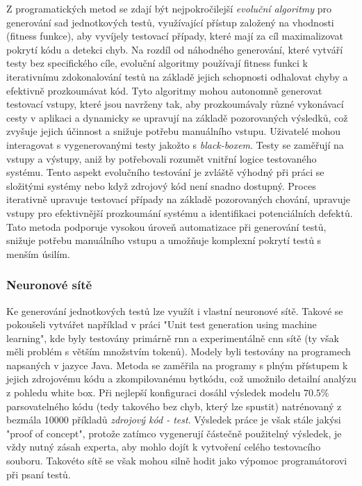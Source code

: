 \documentclass[czech, ma, kiv, he, iso690alph, pdf, viewonly]{fasthesis}
\begin{document}
        Z programatických metod se zdají být nejpokročilejší \emph{evoluční algoritmy} pro generování sad jednotkových testů, využívající přístup založený na vhodnosti (fitness funkce), aby vyvíjely testovací případy, které mají za cíl maximalizovat pokrytí kódu a detekci chyb. Na rozdíl od náhodného generování, které vytváří testy bez specifického cíle, evoluční algoritmy používají fitness funkci k iterativnímu zdokonalování testů na základě jejich schopnosti odhalovat chyby a efektivně prozkoumávat kód. Tyto algoritmy mohou autonomně generovat testovací vstupy, které jsou navrženy tak, aby prozkoumávaly různé vykonávací cesty v aplikaci a dynamicky se upravují na základě pozorovaných výsledků, což zvyšuje jejich účinnost a snižuje potřebu manuálního vstupu. Uživatelé mohou interagovat s vygenerovanými testy jakožto s \textit{black-boxem}. Testy se zaměřují na vstupy a výstupy, aniž by potřebovali rozumět vnitřní logice testovaného systému. Tento aspekt evolučního testování je zvláště výhodný při práci se složitými systémy nebo když zdrojový kód není snadno dostupný. Proces iterativně upravuje testovací případy na základě pozorovaných chování, upravuje vstupy pro efektivnější prozkoumání systému a identifikaci potenciálních defektů. Tato metoda podporuje vysokou úroveň automatizace při generování testů, snižuje potřebu manuálního vstupu a umožňuje komplexní pokrytí testů s menším úsilím. \cite{CAMPOS2018207} \cite{abs-2111-05003}

        \subsubsection{Neuronové sítě}
        Ke generování jednotkových testů lze využít i vlastní neuronové sítě. Takové se pokoušeli vytvářet například v práci "Unit test generation using machine learning"\cite{Saes2018UnitTestGeneration}, kde byly testovány primárně \Acrshort{rnn} a experimentálně \Acrshort{cnn} sítě (ty však měli problém s větším množstvím tokenů). Modely byli testovány na programech napsaných v jazyce Java. Metoda se zaměřila na programy s plným přístupem k jejich zdrojovému kódu a zkompilovanému bytkódu, což umožnilo detailní analýzu z pohledu white box. Při nejlepší konfiguraci dosáhl výsledek modelu \(70.5\%\) parsovatelného kódu (tedy takového bez chyb, který lze spustit) natrénovaný z bezmála 10000 příkladů \textit{zdrojový kód - test}. Výsledek práce je však stále jakýsi "proof of concept", protože zatímco vygenerují částečně použitelný výsledek, je vždy nutný zásah experta, aby mohlo dojít k vytvoření celého testovacího souboru. Takovéto sítě se však mohou silně hodit jako výpomoc programátorovi při psaní testů.
\end{document}
